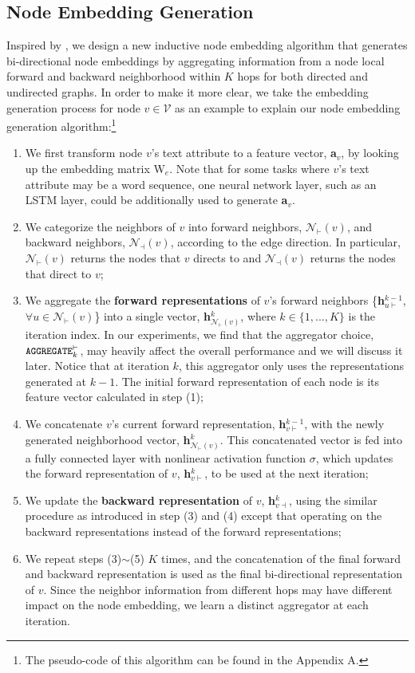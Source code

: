 \documentclass{article} \usepackage{iclr2019_conference,times}
\begin{document}
\subsection{Node Embedding Generation}
Inspired by \cite{hamilton2017inductive}, we design a new inductive node embedding algorithm that generates bi-directional node embeddings by aggregating information from a node local forward and backward neighborhood within $K$ hops for both directed and undirected graphs.
In order to make it more clear, we take the embedding generation process for node $v\in \mathcal{V}$ as an example to explain our node embedding generation algorithm:\footnote{The pseudo-code of this algorithm can be found in the Appendix A.}
\begin{enumerate}[1)]
    \item We first transform node $v$'s text attribute to a feature vector, \textbf{a}$_{v}$, by looking up the embedding matrix W$_{e}$. Note that for some tasks where $v$'s text attribute may be a word sequence, one neural network layer, such as an LSTM layer, could be additionally used to generate \textbf{a}$_{v}$.
    \item We categorize the neighbors of $v$ into forward neighbors, $\mathcal{N}_{\vdash}(v)$, and backward neighbors, $\mathcal{N}_{\dashv}(v)$, according to the edge direction. In particular, $\mathcal{N}_{\vdash}(v)$ returns the nodes that $v$ directs to and $\mathcal{N}_{\dashv}(v)$ returns the nodes that direct to $v$;
    \item We aggregate the \textbf{forward representations} of $v$'s forward neighbors \{\textbf{h}$_{u\vdash}^{k-1}$, $\forall u \in \mathcal{N}_{\vdash}(v)$\} into a single vector, \textbf{h}$_{\mathcal{N}_{\vdash}(v)}^{k}$, where $k$$\in$$\{1,...,K\}$ is the iteration index.
    In our experiments, we find that the aggregator choice, $\small \texttt{AGGREGATE}_{k}^{\vdash}$, may heavily affect the overall performance and we will discuss it later.
    Notice that at iteration $k$, this aggregator only uses the representations generated at $k-1$. The initial forward representation of each node is its feature vector calculated in step (1);
    \item We concatenate $v$'s current forward representation, \textbf{h}$_{v\vdash}^{k-1}$, with the newly generated neighborhood vector, \textbf{h}$_{\mathcal{N}_{\vdash}(v)}^{k}$. This concatenated vector is fed into a fully connected layer with nonlinear activation function $\sigma$, which updates the forward representation of $v$, \textbf{h}$_{v\vdash}^{k}$, to be used at the next iteration;
    \item We update the \textbf{backward representation} of $v$, \textbf{h}$_{v\dashv}^{k}$, using the similar procedure as introduced in step (3) and (4) except that operating on the backward representations instead of the forward representations;
    \item We repeat steps (3)$\sim$(5) $K$ times, and the concatenation of the final forward and backward representation is used as the final bi-directional representation of $v$. Since the neighbor information from different hops may have different impact on the node embedding, we learn a distinct aggregator at each iteration.
\end{enumerate}
\end{document}
